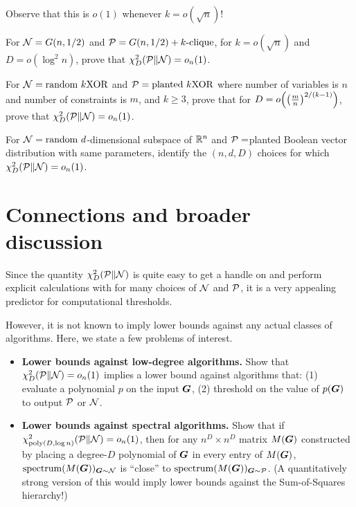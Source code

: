 \documentclass[11pt, letterpaper]{article}
\newcommand{\Null}{\calN}
\newcommand{\Planted}{\calP}
\begin{document}
Observe that this is $o(1)$ whenever $k = o(\sqrt{n})$!
\begin{tcolorbox}[arc=3mm,colback=White,coltext=Black,boxrule=1pt]
    \begin{exercise}
        For $\Null = G(n,1/2)$ and $\Planted=G(n,1/2)+k\text{-clique}$, for $k = o(\sqrt{n})$ and $D = o(\log^2 n)$, prove that $\chi^2_D(\Planted\|\Null) = o_n(1)$. 
    \end{exercise}
\end{tcolorbox}

\begin{tcolorbox}[arc=3mm,colback=White,coltext=Black,boxrule=1pt]
    \begin{exercise}
        For $\Null = \text{random }k\text{XOR}$ and $\Planted=\text{planted }k\text{XOR}$ where number of variables is $n$ and number of constraints is $m$, and $k \ge 3$, prove that for $D = o\parens*{ \parens*{\frac{m}{n}}^{2/(k-1)} }$, prove that $\chi^2_D(\Planted\|\Null) = o_n(1)$. 
    \end{exercise}
\end{tcolorbox}


\begin{tcolorbox}[arc=3mm,colback=White,coltext=Black,boxrule=1pt]
    \begin{exercise}[{Hard}]
        For $\Null = \text{random }d$-dimensional subspace of $\mathbb R^n$ and $\Planted=$planted Boolean vector distribution with same parameters, identify the $(n,d,D)$ choices for which $\chi^2_D(\Planted\|\Null) = o_n(1)$. 
    \end{exercise}
\end{tcolorbox}


\section{Connections and broader discussion}
Since the quantity $\chi^2_D(\Planted\|\Null)$ is quite easy to get a handle on and perform explicit calculations with for many choices of $\Null$ and $\Planted$, it is a very appealing predictor for computational thresholds.

However, it is not known to imply lower bounds against any actual classes of algorithms.
Here, we state a few problems of interest.
\begin{itemize}
    \item {\bf Lower bounds against low-degree algorithms.} Show that $\chi^2_D(\Planted\|\Null) = o_n(1)$ implies a lower bound against algorithms that: (1) evaluate a polynomial $p$ on the input $\boldsymbol{G}$, (2) threshold on the value of $p(\boldsymbol{G})$ to output $\Planted$ or $\Null$.
    \item {\bf Lower bounds against spectral algorithms.} Show that if $\chi^2_{\mathrm{poly}(D,\log n)}(\Planted\|\Null) = o_n(1)$, then for any $n^D\times n^D$ matrix $M(\boldsymbol{G})$ constructed by placing a degree-$D$ polynomial of $\boldsymbol{G}$ in every entry of $M(\boldsymbol{G})$, $\mathrm{spectrum}(M(\bG))_{\bG\sim \Null}$ is ``close'' to $\mathrm{spectrum}(M(\bG))_{\bG\sim \Planted}$.
    (A quantitatively strong version of this would imply lower bounds against the Sum-of-Squares hierarchy!)
\end{itemize}
\end{document}
